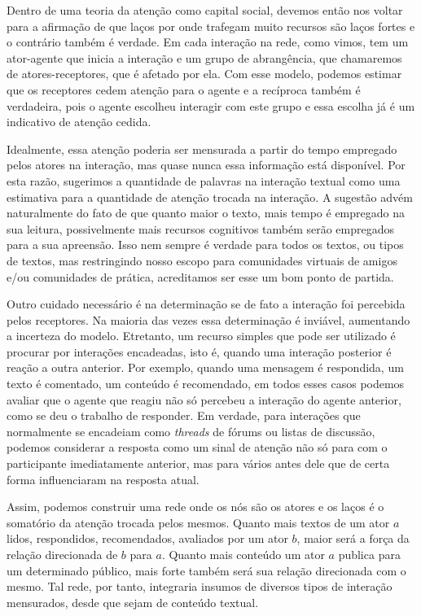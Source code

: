 \documentclass{article}
\begin{document}
Dentro de uma teoria da atenção como capital social, devemos então nos voltar
para a afirmação de que laços por onde trafegam muito recursos são laços fortes
e o contrário também é verdade. Em cada interação na rede, como vimos, tem um
ator-agente que inicia a interação e um grupo de abrangência, que chamaremos de
atores-receptores, que é afetado por ela. Com esse modelo, podemos estimar que
os receptores cedem atenção para o agente e a recíproca também é verdadeira,
pois o agente escolheu interagir com este grupo e essa escolha já é um
indicativo de atenção cedida.

Idealmente, essa atenção poderia ser mensurada a partir do tempo empregado pelos
atores na interação, mas quase nunca essa informação está disponível. Por esta
razão, sugerimos a quantidade de palavras na interação textual como uma
estimativa para a quantidade de atenção trocada na interação. A sugestão advém
naturalmente do fato de que quanto maior o texto, mais tempo é empregado na sua
leitura, possivelmente mais recursos cognitivos também serão empregados para a
sua apreensão. Isso nem sempre é verdade para todos os textos, ou tipos de
textos, mas restringindo nosso escopo para comunidades virtuais de amigos e/ou
comunidades de prática, acreditamos ser esse um bom ponto de partida.

Outro cuidado necessário é na determinação se de fato a interação foi percebida
pelos receptores. Na maioria das vezes essa determinação é inviável, aumentando
a incerteza do modelo. Etretanto, um recurso simples que pode ser utilizado é
procurar por interações encadeadas, isto é, quando uma interação posterior é 
reação a outra anterior. Por exemplo, quando uma mensagem é respondida, um texto
é comentado, um conteúdo é recomendado, em todos esses casos podemos avaliar que
o agente que reagiu não só percebeu a interação do agente anterior, como se deu
o trabalho de responder. Em verdade, para interações que normalmente se
encadeiam como \textit{threads} de fórums ou listas de discussão, podemos
considerar a resposta como um sinal de atenção não só para com o participante
imediatamente anterior, mas para vários antes dele que de certa forma
influenciaram na resposta atual.

Assim, podemos construir uma rede onde os nós são os atores e os laços é o
somatório da atenção trocada pelos mesmos. Quanto mais textos de um ator $a$
lidos, respondidos, recomendados, avaliados por um ator $b$, maior será a força
da relação direcionada de $b$ para $a$. Quanto mais conteúdo um ator $a$ publica
para um determinado público, mais forte também será sua relação direcionada
com o mesmo. Tal rede, por tanto, integraria insumos de diversos tipos de
interação mensurados, desde que sejam de conteúdo textual.
\end{document}
